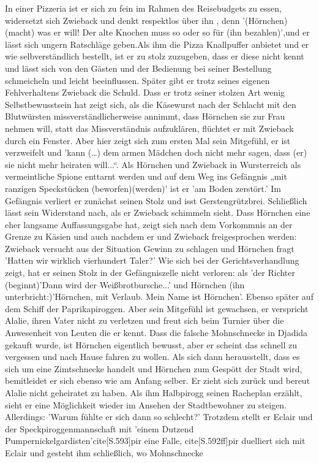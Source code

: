 In einer Pizzeria ist er sich zu fein im Rahmen des Reisebudgets zu essen, widersetzt sich Zwieback und denkt respektlos über ihn \cite[S.170f]{pir}, denn '(Hörnchen) (macht) was er will! Der alte Knochen muss so oder so für (ihn bezahlen)',\cite[S.170f]{pir}und er lässt sich ungern Ratschläge geben.\cite[S.170f]{pir}\cite[S.219f]{pir}Als ihm die Pizza Knallpuffer anbietet und er wie selbverständlich bestellt, ist er zu stolz zuzugeben, dass er diese nicht kennt und lässt sich von den Gästen und der Bedienung bei seiner Bestellung schmeicheln und leicht beeinflussen.\cite[S.171]{pir} Später gibt er trotz seines eigenen Fehlverhaltens Zwieback die Schuld.\cite[S.219]{pir} Dass er trotz seiner stolzen Art wenig Selbstbewusstsein hat zeigt sich, als die Käsewurst nach der Schlacht mit den Blutwürsten missverständlicherweise annimmt, dass Hörnchen sie zur Frau nehmen will,\cite[S.230]{pir} statt das Missverständnis aufzuklären, flüchtet er mit Zwieback durch ein Fenster.\cite[S.233ff]{pir} Aber hier zeigt sich zum ersten Mal sein Mitgefühl, er ist verzweifelt und 'kann (…) dem armen Mädchen doch nicht mehr sagen, dass (er) sie nicht mehr heiraten will...“.\cite[S.239]{pir} Als Hörnchen und Zwieback in Wursterreich als vermeintliche Spione enttarnt werden und auf dem Weg ins Gefängnis „mit ranzigen Speckstücken (beworfen)(werden)'\cite[S.294]{pir} ist er 'am Boden zerstört.'\cite[S.294]{pir} Im Gefängnis verliert er zunächst seinen Stolz und isst Gerstengrützbrei.\cite[S.322]{pir} Schließlich lässt sein Widerstand nach, als er Zwieback schimmeln sieht.\cite[S.322]{pir} Dass Hörnchen eine eher langsame Auffassungsgabe hat, zeigt sich nach dem Vorkommnis an der Grenze zu Käsien \cite[S.142]{pir} und auch nachdem er und Zwieback freigesprochen werden: Zwieback versucht aus der Situation Gewinn zu schlagen und Hörnchen fragt 'Hatten wir wirklich vierhundert Taler?' \cite[S.331]{pir} Wie sich bei der Gerichtsverhandlung zeigt, hat er seinen Stolz in der Gefängniszelle nicht verloren: \cite[S.336]{pir} als 'der Richter (beginnt)'Dann wird der Weißbrotbursche...' und Hörnchen (ihn unterbricht:)'Hörnchen, mit Verlaub. Mein Name ist Hörnchen'.\cite[S.336f]{pir} Ebenso später auf dem Schiff der Paprikapiroggen.\cite[S.367f]{pir} Aber sein Mitgefühl ist gewachsen, er verspricht Alalie, ihren Vater nicht zu verletzen \cite[S.341]{pir} und freut sich beim Turnier über die Anwesenheit von Leuten die er kennt.\cite[S.349]{pir} Dass die falsche Mohnschnecke in Djadida gekauft wurde, ist Hörnchen eigentlich bewusst, aber er scheint das schnell zu vergessen und nach Hause fahren zu wollen.\cite[S.390]{pir} Als sich dann herausstellt, dass es sich um eine Zimtschnecke handelt und Hörnchen zum Gespött der Stadt wird, bemitleidet er sich ebenso wie am Anfang selber.\cite[S.514]{pir} Er zieht sich zurück und bereut Alalie nicht geheiratet zu haben.\cite[S.538]{pir} Als ihm Halbpirogg seinen Racheplan erzählt, sieht er eine Möglichkeit wieder im Ansehen der Stadtbewohner zu steigen. \cite[S.540]{pir} Allerdings: 'Warum fühlte er sich dann so schlecht?'\cite[S.559]{pir} Trotzdem stellt er Eclair und der Speckpiroggenmannschaft mit 'einem Dutzend Pumpernickelgardisten'cite[S.593]{pir} eine Falle, cite[S.592ff]{pir} duelliert sich mit Eclair \cite[S.596ff]{pir} und gesteht ihm schließlich, wo Mohnschnecke 